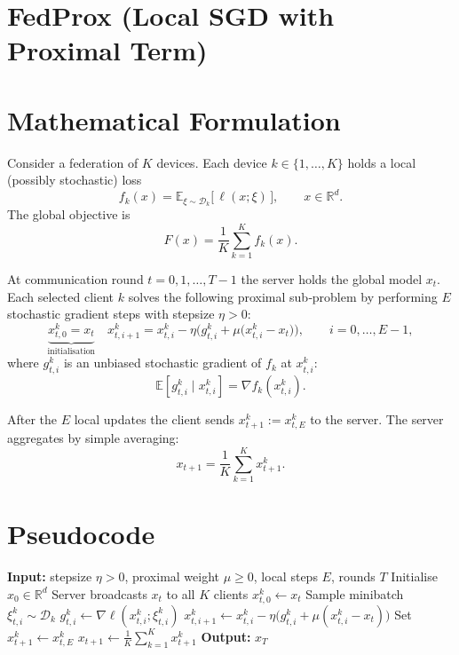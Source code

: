 \documentclass{article}
\newcommand{\EE}{\mathbb{E}}
\newcommand{\RR}{\mathbb{R}}
\begin{document}
\section*{FedProx (Local SGD with Proximal Term)}

\section*{Mathematical Formulation}
Consider a federation of $K$ devices.  
Each device $k\in\{1,\dots ,K\}$ holds a local (possibly stochastic) loss
\[
f_k(x)=\EE_{\xi\sim\mathcal{D}_k}\big[\,\ell(x;\xi)\,\big],\qquad x\in\RR^{d}.
\]
The global objective is 
\[
F(x)=\frac1K\sum_{k=1}^{K}f_k(x).                         \tag{1}
\]

At communication round $t=0,1,\dots ,T-1$ the server holds the global model
$x_t$.  Each selected client $k$ solves the following proximal sub‑problem
by performing $E$ stochastic gradient steps with stepsize $\eta>0$:
\[
\underbrace{x_{t,0}^{k}=x_t}_{\text{initialisation}}\quad
x_{t,i+1}^{k}=x_{t,i}^{k}
-\eta\Big(g_{t,i}^{k}
+\mu\big(x_{t,i}^{k}-x_t\big)\Big),\qquad i=0,\dots ,E-1,
\tag{2}
\]
where $g_{t,i}^{k}$ is an unbiased stochastic gradient of $f_k$ at
$x_{t,i}^{k}$:
\[
\EE\!\left[g_{t,i}^{k}\mid x_{t,i}^{k}\right]=\nabla f_k(x_{t,i}^{k}).
\]

After the $E$ local updates the client sends $x_{t+1}^{k}:=x_{t,E}^{k}$ to the
server.  The server aggregates by simple averaging:
\[
x_{t+1}= \frac1K\sum_{k=1}^{K}x_{t+1}^{k}.                     \tag{3}
\]

\section*{Pseudocode}
\begin{algorithm}[H]
\caption{FedProx}
\begin{algorithmic}[1]
\State \textbf{Input:} stepsize $\eta>0$, proximal weight $\mu\ge0$, local steps $E$, rounds $T$
\State Initialise $x_0\in\RR^{d}$
    \State Server broadcasts $x_t$ to all $K$ clients
        \State $x_{t,0}^{k}\gets x_t$
            \State Sample minibatch $\xi_{t,i}^{k}\sim\mathcal{D}_k$
            \State $g_{t,i}^{k}\gets \nabla\ell(x_{t,i}^{k};\xi_{t,i}^{k})$
            \State $x_{t,i+1}^{k}\gets x_{t,i}^{k}
                -\eta\big(g_{t,i}^{k}+\mu(x_{t,i}^{k}-x_t)\big)$   
        \EndFor
        \State Set $x_{t+1}^{k}\gets x_{t,E}^{k}$
    \EndFor
    \State $x_{t+1}\gets \frac1K\sum_{k=1}^{K}x_{t+1}^{k}$   
\EndFor
\State \textbf{Output:} $x_T$
\end{algorithmic}
\end{algorithm}
\end{document}
